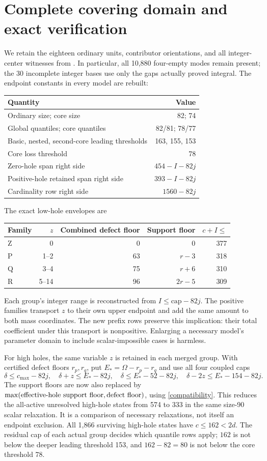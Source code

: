 \documentclass[11pt,a4paper]{article}
\begin{document}
\section{Complete covering domain and exact verification}
We retain the eighteen ordinary units, contributor orientations, and all
integer-center witnesses from \cite{previous}. In particular, all
10,880 four-empty modes remain present; the 30 incomplete integer bases
use only the gaps actually proved integral.
The endpoint constants in every model are rebuilt:
\begin{center}\small
\begin{tabular}{lr}\toprule
Quantity&Value\\\midrule
Ordinary size; core size&82; 74\\
Global quantiles; core quantiles&82/81; 78/77\\
Basic, nested, second-core leading thresholds&163, 155, 153\\
Core loss threshold&78\\
Zero-hole span right side&$454-I-82j$\\
Positive-hole retained span right side&$393-I-82j$\\
Cardinality row right side&$1560-82j$\\\bottomrule
\end{tabular}
\end{center}
The exact low-hole envelopes are
\begin{center}\small
\begin{tabular}{lrrrr}\toprule
Family&$z$&Combined defect floor&Support floor&$c+I\le$\\\midrule
Z&0&0&0&377\\
P&1--2&63&$r-3$&318\\
Q&3--4&75&$r+6$&310\\
R&5--14&96&$2r-5$&309\\\bottomrule
\end{tabular}
\end{center}
Each group's integer range is reconstructed from
$I\le\text{cap}-82j$. The positive families transport $z$ to their
own upper endpoint and add the same amount to both mass coordinates.
The new prefix rows preserve this implication: their total coefficient
under this transport is nonpositive. Enlarging a necessary model's
parameter domain to include scalar-impossible cases is harmless.

For high holes, the same variable $z$ is retained in each merged group.
With certified defect floors $r_p,r_q$, put
$E_*=\Omega-r_p-r_q$ and use all four coupled caps
\[
 \delta\le c_{\max}-82j,\quad \delta+z\le E_*-82j,
 \quad\delta\le E_*-52-82j,
 \quad\delta-2z\le E_*-154-82j.
\]
The support floors are now also replaced by
$\max(\hbox{effective-hole support floor},\hbox{defect floor})$,
using \eqref{compatibility}. This reduces the all-active unresolved
high-hole states from 574 to 333 in the same size-90 scalar relaxation.
It is a comparison of necessary relaxations, not itself an endpoint
exclusion. All 1,866 surviving high-hole states have $c\le162<2d$.
The residual cap of each actual group decides which quantile rows apply;
$162$ is not below the deeper leading threshold 153, and $162-82=80$
is not below the core threshold 78.
\end{document}
